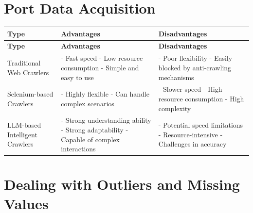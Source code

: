 \documentclass[11pt]{article} %
\begin{document}
\section{Port Data Acquisition}
% 
% 
\begin{longtable}{
    >{\raggedright\arraybackslash}m{}
    >{\raggedright\arraybackslash}m{}
    >{\raggedright\arraybackslash}m{}
}
    \hline
    \textbf{Type}                     & \textbf{Advantages} & \textbf{Disadvantages} \\
    \hline
    \endfirsthead

    \hline
    \textbf{Type}                     & \textbf{Advantages} & \textbf{Disadvantages} \\
    \hline
    \endhead

    \hline
    \endfoot

    \hline
    Traditional Web Crawlers          &
    - Fast speed\newline
    - Low resource consumption\newline
    - Simple and easy to use          &
    - Poor flexibility\newline
    - Easily blocked by anti-crawling mechanisms                                     \\
    \hline
    Selenium-based Crawlers           &
    - Highly flexible\newline
    - Can handle complex scenarios    &
    - Slower speed\newline
    - High resource consumption\newline
    - High complexity                                                                \\
    \hline
    LLM-based Intelligent Crawlers    &
    - Strong understanding ability\newline
    - Strong adaptability\newline
    - Capable of complex interactions &
    - Potential speed limitations\newline
    - Resource-intensive\newline
    - Challenges in accuracy                                                         \\
    \hline
\end{longtable}
% 
% 
% 
% 
\section{Dealing with Outliers and Missing Values}
% 
% 
% 
% 
% 
% 
% 
% 
% 
\end{document}
